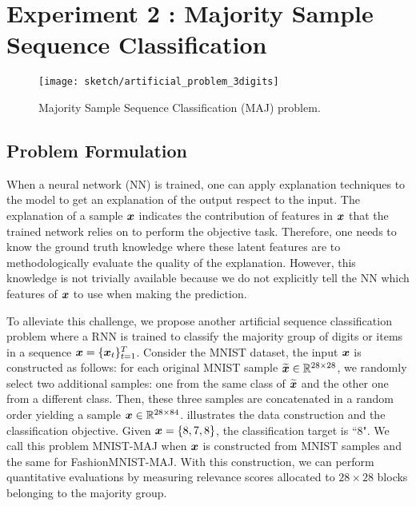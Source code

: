 \section{Experiment 2 : Majority Sample Sequence Classification} \label{sec:exp2}
   
 \begin{figure}[!htb]
\centering
\texttt{[image: sketch/artificial\_problem\_3digits]}
\caption{Majority Sample Sequence Classification (MAJ) problem.} 
\label{fig:artificial_problem_3digits}
\end{figure}

\subsection{Problem Formulation} \label{sec:exp2_prob_formulate}
When a neural network (NN) is trained, one can apply explanation techniques to the model to get an explanation of the output respect to the input.  The explanation of a sample $\boldsymbol{x}$ indicates the contribution of features in $\boldsymbol{x}$ that the trained network relies on to perform the objective task.  Therefore, one needs to know the ground truth knowledge where these latent features are to methodologically evaluate the quality of the explanation.  However, this knowledge is not trivially available because we do not explicitly tell the NN which features of $\boldsymbol{x}$ to use when making the prediction.


To alleviate this challenge, we propose another artificial sequence classification problem where a RNN is trained to classify  the majority group of digits or items in a sequence $\boldsymbol{x} = \{ \boldsymbol{x}_t \}_{t=1}^{T}$. Consider  the MNIST dataset, the input $\boldsymbol{x}$ is constructed as follows: for each original MNIST sample $\widetilde{\boldsymbol{x}} \in \mathbb{R}^{28 \times 28}$, we randomly select two additional samples: one from the same class of $\widetilde{\boldsymbol{x}}$ and the other one from a different class. Then, these three samples are concatenated in a random order yielding a sample $\boldsymbol{x} \in \mathbb{R}^{28 \times 84}$.  \addfigure{\ref{fig:artificial_problem_3digits}} illustrates the data construction and the classification objective. Given $\boldsymbol{x} = \{ 8, 7, 8\}$, the classification target is ``8".  We call this problem MNIST-MAJ when $\boldsymbol{x}$ is constructed from MNIST samples and the same for FashionMNIST-MAJ. With this construction, we can perform quantitative evaluations by measuring relevance scores allocated to $28\times28$ blocks belonging to the majority group.
%


